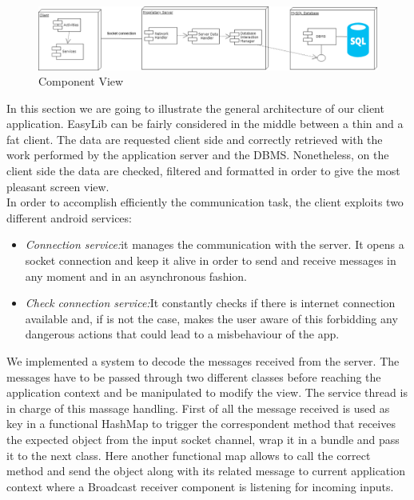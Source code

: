 \vspace*{0.5cm}
\begin{figure}[H]
	\centering
	\includegraphics[scale=0.65]{Images/Diagrams/Component_diagram}
	\caption{Component View}
\end{figure}
\vspace*{0cm}
In this section we are going to illustrate the general architecture of our client application. EasyLib can be fairly considered in the middle between a thin and a fat client. The data are requested client side and correctly retrieved with the work performed by the application server and the DBMS. Nonetheless, on the client side the data are checked, filtered and formatted in order to give the most pleasant screen view.
\\ 
In order to accomplish efficiently the communication task, the client exploits two different android services: 

\begin{itemize}
\item \emph{Connection service:}it manages the communication with the server. It opens a socket connection and keep it alive in order to send and receive messages in any moment and in an asynchronous fashion.
\item \emph{Check connection service:}It constantly checks if there is internet connection available and, if is not the case, makes the user aware of this forbidding any dangerous actions that could lead to a misbehaviour of the app.
\end{itemize}

We implemented a system to decode the messages received from the server. The messages have to be passed through two different classes before reaching the application context and be manipulated to modify the view. The service thread is in charge of this massage handling. First of all the message received is used as key in a functional HashMap to trigger the correspondent method that receives the expected object from the input socket channel, wrap it in a bundle and pass it to the next class. Here another functional map allows to call the correct method and send the object along with its related message to current application context where a Broadcast receiver component is listening for incoming inputs.


